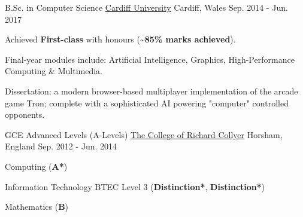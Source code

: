 \pagebreak


\begin{cventries}

  \cventry
    {B.Sc. in Computer Science} %
    {\href{https://www.cardiff.ac.uk/}{Cardiff University}} %
    {Cardiff, Wales} %
    {Sep. 2014 - Jun. 2017} %
    {
      \begin{cvitems} %
        \item Achieved \textbf{First-class} with honours (\textbf{\textasciitilde{}85\% marks achieved}).
        \item Final-year modules include: Artificial Intelligence, Graphics, High-Performance Computing \& Multimedia.
        \item Dissertation: a modern browser-based multiplayer implementation of the arcade game Tron; complete with a sophisticated AI powering "computer" controlled opponents.
      \end{cvitems}
    }
    {}

  \cventry
    {GCE Advanced Levels (A-Levels)} %
    {\href{https://www.collyers.ac.uk/}{The College of Richard Collyer}} %
    {Horsham, England} %
    {Sep. 2012 - Jun. 2014} %
    {
      \begin{cvitems} %
        \item {Computing (\textbf{A*})}
        \item {Information Technology BTEC Level 3 (\textbf{Distinction*}, \textbf{Distinction*})}
        \item {Mathematics (\textbf{B})}
      \end{cvitems}
    }
    {}

\end{cventries}
